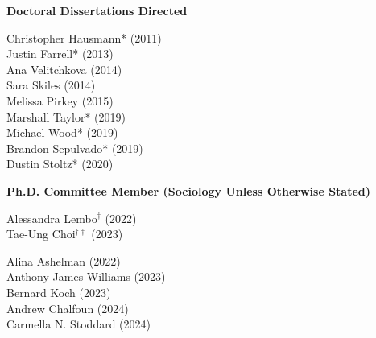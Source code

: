 
\noindent \textbf{Doctoral Dissertations Directed }

\begin{multicols}{2}
    \noindent
    Christopher Hausmann\textcolor{uclablue}{*} (2011) \\
    Justin Farrell\textcolor{uclablue}{*} (2013) \\
    Ana Velitchkova (2014) \\
    Sara Skiles (2014) \\
    Melissa Pirkey (2015) \\
    Marshall Taylor\textcolor{uclablue}{*} (2019) \\
    Michael Wood\textcolor{uclablue}{*} (2019) \\
    Brandon Sepulvado\textcolor{uclablue}{*} (2019) \\
    Dustin Stoltz\textcolor{uclablue}{*} (2020) 
\end{multicols}
\medskip

\medskip
\noindent \textbf{Ph.D. Committee Member (Sociology Unless Otherwise Stated)} 

\begin{multicols}{2} \noindent
    Alessandra Lembo\textcolor{uclablue}{$^{\dag}$} (2022) \\
    Tae-Ung Choi\textcolor{uclablue}{$^{\dag \dag}$} (2023) 
\end{multicols}

\begin{multicols}{2} \noindent
    Alina Ashelman (2022) \\
    Anthony James Williams (2023) \\
    Bernard Koch (2023) \\
    Andrew Chalfoun (2024) \\
    Carmella N. Stoddard (2024) 
\end{multicols}

